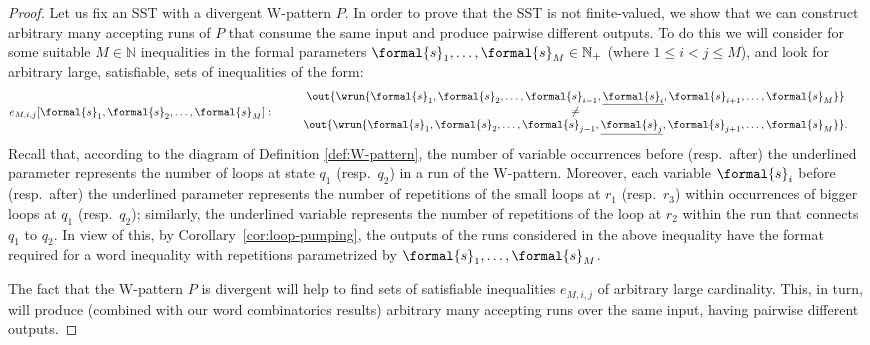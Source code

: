 \documentclass{article}
\begin{document}
\begin{proof}
Let us fix an SST with a divergent W-pattern $P$.
In order to prove that the SST is not finite-valued, we show that we can construct
arbitrary many accepting runs 
of $P$ that consume the 
same input and produce pairwise different outputs.
To do this we will consider for some suitable $M \in \mathbb{N}$
inequalities in the formal parameters 
$\formal{s}_1, \ldots, \formal{s}_M \in \mathbb{N}_+$ (where $1 \leq i < j \leq M$),
and look for arbitrary large, satisfiable, sets of inequalities of the form:
\begin{align*}
    &e_{M,i,j}[\formal{s}_1,\formal{s}_2, \ldots, \formal{s}_M]: %
    \quad\left.
    \begin{array}{ccc}
         & \out{\wrun{\formal{s}_1,\formal{s}_2,\ldots,\formal{s}_{i-1},\underline{\formal{s}_{i}},\formal{s}_{i+1}, \ldots ,\formal{s}_M}}\\
         & \neq\\
         & \out{\wrun{\formal{s}_1,\formal{s}_2,\ldots,\formal{s}_{j-1},\underline{\formal{s}_{j}},\formal{s}_{j+1}, \ldots ,\formal{s}_M}}.
    \end{array}
    \right.
\end{align*}
Recall that, according to the diagram of Definition \ref{def:W-pattern},
the number of variable occurrences before (resp.~after) the underlined parameter 
represents the number of loops at state $q_1$ (resp.~$q_2$) in a run of the W-pattern.
Moreover, each variable $\formal{s}_i$ before (resp.~after) the underlined parameter 
represents the number of repetitions of the small loops at $r_1$ (resp.~$r_3$) within 
occurrences of bigger loops at $q_1$ (resp.~$q_2$); similarly, the underlined
variable represents the number of repetitions of the loop at $r_2$ within
the run that connects $q_1$ to $q_2$.
In view of this, by Corollary~\ref{cor:loop-pumping}, the outputs of the runs 
considered in the above inequality have the format required for a word inequality 
with repetitions parametrized by $\formal{s}_1, \ldots, \formal{s}_M$.

The fact that the W-pattern $P$ is divergent will help to find sets
of satisfiable inequalities $e_{M,i,j}$ of arbitrary large
cardinality. This, in turn, will produce (combined with our word
combinatorics results) arbitrary many accepting runs 
over the 
same input, having pairwise different outputs.



\end{proof}
\end{document}
